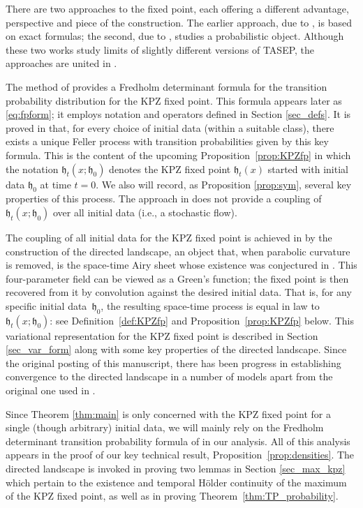 \documentclass[oneside,final,11pt]{amsart}
\theoremstyle{definition}
\newcommand{\fh}{\mathfrak{h}}
\newcommand{\1}[1]{\mathbf{1}_{#1}}
\numberwithin{equation}{section}
\begin{document}
There are two approaches to the fixed point, each offering a different advantage, perspective and piece of the construction. The earlier approach, due to \cite{fixedpt}, is based on exact formulas; the second, due to \cite{Landscape}, studies a probabilistic object. Although these two works study limits of slightly different versions of TASEP, the approaches are united in \cite{NQR20}. 

The method of \cite{fixedpt} provides a Fredholm determinant formula for the transition probability distribution for the KPZ fixed point.
This formula appears later as \eqref{eq:fpform}; it employs notation and operators defined in Section \ref{sec_defs}. It is proved in \cite{fixedpt} that, for every choice of initial data (within a suitable class), there exists a unique Feller process with transition probabilities given by this key formula. This is the content of the upcoming Proposition~\ref{prop:KPZfp} in which the notation $\fh_{t}(x; \fh_0)$ denotes the KPZ fixed point $\fh_{t}(x)$ started with initial data $\fh_0$ at time $t = 0$. We also will record, as Proposition \ref{prop:sym}, several key properties of this process. The approach in \cite{fixedpt} does not provide a coupling of $\fh_{t}(x; \fh_0)$ over all initial data (i.e., a stochastic flow).

The coupling of all initial data for the KPZ fixed point is achieved in \cite{Landscape} by the construction of the directed landscape, an object that, when parabolic curvature is removed, is the space-time Airy sheet whose existence was conjectured in \cite{cqrFixedPt}.
This four-parameter field can be viewed as a Green's function; the fixed point is then recovered from it by convolution against the desired initial data. That is, for any specific initial data~$\fh_0$, the resulting space-time process is equal in law to $\fh_{t}(x; \fh_0)$: see Definition~\ref{def:KPZfp} and Proposition~\ref{prop:KPZfp} below. This variational representation for the KPZ fixed point is described in Section \ref{sec_var_form} along with some key properties of the directed landscape. Since the original posting of this manuscript, there has been progress \cite{dauvergne2021scaling} in establishing convergence to the directed landscape in a number of models apart from the original one used in \cite{Landscape}.

Since Theorem \ref{thm:main} is only concerned with the KPZ fixed point for a single (though arbitrary) initial data, we will mainly rely on the Fredholm determinant transition probability formula of \cite{fixedpt} in our analysis.  All of this analysis appears in the proof of our key technical result, Proposition~\ref{prop:densities}. The directed landscape is invoked in proving two lemmas in Section \ref{sec_max_kpz} which pertain to the existence and temporal H\"older continuity of the maximum of the KPZ fixed point, as well as in proving Theorem~\ref{thm:TP_probability}.
\end{document}
